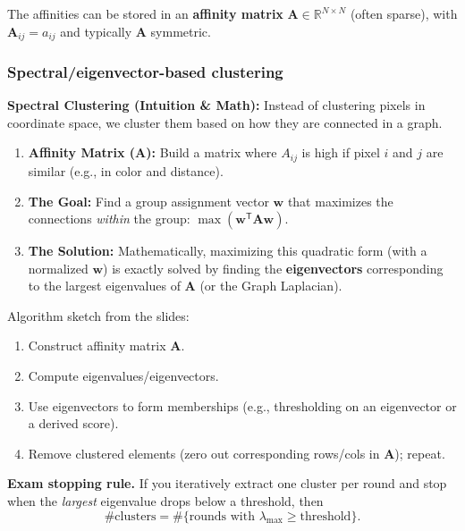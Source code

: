 \documentclass[11pt,a4paper]{article}
\newcommand{\R}{\mathbb{R}}
\newcommand{\vct}[1]{\bm{#1}}
\newcommand{\mat}[1]{\mathbf{#1}}
\newcommand{\T}{^\mathsf{T}}
\begin{document}
\begin{notebox}
The affinities can be stored in an \textbf{affinity matrix} $\mat{A}\in\R^{N\times N}$ (often sparse),
with $\mat{A}_{ij}=a_{ij}$ and typically $\mat{A}$ symmetric.
\end{notebox}

\subsubsection{Spectral/eigenvector-based clustering}

\begin{mathrule}
\textbf{Spectral Clustering (Intuition \& Math):}
Instead of clustering pixels in coordinate space, we cluster them based on how they are connected in a graph.
\begin{enumerate}
  \item \textbf{Affinity Matrix ($\mat{A}$):} Build a matrix where $A_{ij}$ is high if pixel $i$ and $j$ are similar (e.g., in color and distance).
  \item \textbf{The Goal:} Find a group assignment vector $\vct{w}$ that maximizes the connections \emph{within} the group: $\max (\vct{w}\T \mat{A}\vct{w})$.
  \item \textbf{The Solution:} Mathematically, maximizing this quadratic form (with a normalized $\vct{w}$) is exactly solved by finding the \textbf{eigenvectors} corresponding to the largest eigenvalues of $\mat{A}$ (or the Graph Laplacian).
\end{enumerate}
\end{mathrule}

Algorithm sketch from the slides:
\begin{enumerate}
  \item Construct affinity matrix $\mat{A}$.
  \item Compute eigenvalues/eigenvectors.
  \item Use eigenvectors to form memberships (e.g., thresholding on an eigenvector or a derived score).
  \item Remove clustered elements (zero out corresponding rows/cols in $\mat{A}$); repeat.
\end{enumerate}

\begin{notebox}
\textbf{Exam stopping rule.} If you iteratively extract one cluster per round and stop when the \emph{largest} eigenvalue drops below a threshold, then
\[
\#\text{clusters} = \#\{\text{rounds with } \lambda_{\max} \ge \text{threshold}\}.
\]
\end{notebox}
\end{document}
